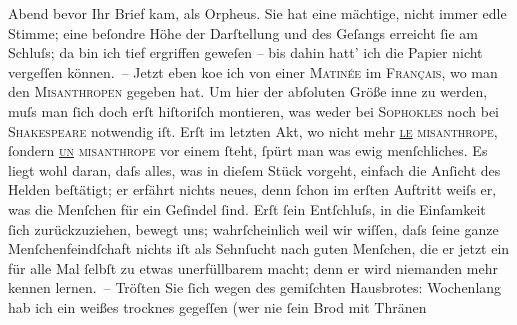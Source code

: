 \begin{ledgroupsized}[t]{13cm}
               Abend bevor Ihr Brief kam, als Orpheus. Sie hat eine {\pb}mächtige, nicht immer
               edle Stimme; eine beſondre Höhe der Darſtellung und des Geſangs erreicht ſie am
               Schluſs; da bin ich tief ergriffen geweſen – bis dahin hatt’ ich die Papier nicht vergeſſen können. –\pend
           \pstart
           Jetzt eben ko{\geminationm}e ich von einer \textsc{Matinée} im \textsc{Français}, wo man den \textsc{Misanthropen} gegeben hat. Um hier der abſoluten Größe inne zu werden, muſs man ſich doch
               erſt hiſtoriſch montieren, was weder bei \textsc{Sophokles} noch bei \textsc{Shakespeare} notwendig iſt. Erſt im letzten Akt, {\pb}wo nicht mehr
                  \textsc{\uline{le} misanthrope}, ſondern \textsc{\uline{un} misanthrope} vor einem ſteht, ſpürt man was
               ewig menſchliches. Es liegt wohl daran, daſs alles, was in dieſem Stück vorgeht, einfach die Anſicht des
               Helden beſtätigt; er erfährt nichts neues, denn ſchon im erſten Auftritt weiſs er,
               was die Menſchen für ein Geſindel ſind. Erſt ſein Entſchluſs, in die Einſamkeit ſich
               zurückzuziehen, bewegt uns; wahrſcheinlich weil wir wiſſen, daſs ſeine ganze
               Menſchenfeindſchaft nichts {\pb}iſt als Sehnſucht nach guten
               Menſchen, die er jetzt ein für alle Mal ſelbſt zu etwas unerfüllbarem macht; denn er
               wird niemanden mehr kennen lernen. –\pend
           \pstart
           Tröſten Sie ſich wegen des gemiſchten Hausbrotes: Wochenlang hab ich ein weißes
               trocknes gegeſſen (wer nie ſein Brod mit Thränen

\end{ledgroupsized}
